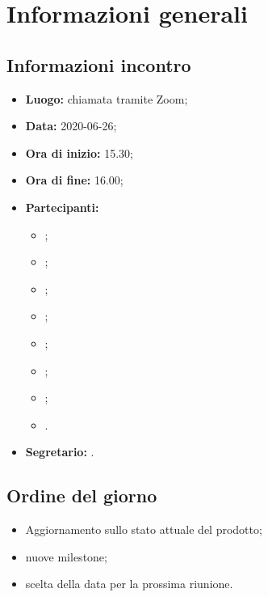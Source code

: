 \section{Informazioni generali}
\subsection{Informazioni incontro}
\begin{itemize}
	\item \textbf{Luogo:} chiamata tramite Zoom;
	\item \textbf{Data:} 2020-06-26;
	\item \textbf{Ora di inizio:} 15.30;
	\item \textbf{Ora di fine:} 16.00;
	\item \textbf{Partecipanti:}
		\begin{itemize}
			\item \VB;
			\item \LB;
			\item \NF;
			\item \EG;
			\item \FJ;
			\item \MP;
			\item \AS;
			\item \AZ.
		\end{itemize}
	\item \textbf{Segretario:} \LB.
\end{itemize}

\subsection{Ordine del giorno}
\begin{itemize}
	\item Aggiornamento sullo stato attuale del prodotto;
	\item nuove milestone;
	\item scelta della data per la prossima riunione.
\end{itemize}
